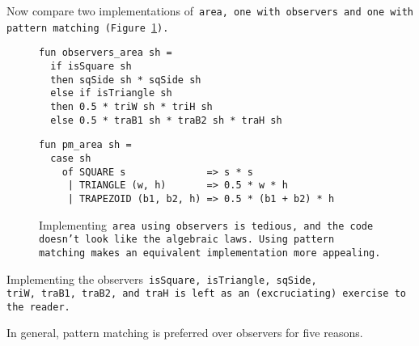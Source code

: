 \documentclass[manuscript,screen 12pt, nonacm]{acmart}
\begin{document}
Now compare two implementations of~\tt{area}, one with observers and one with
pattern matching (Figure~\ref{fig:area}).

    \begin{figure}[H]
      \begin{minipage}[t]{0.7\textwidth}
        \begin{verbatim}
fun observers_area sh =
  if isSquare sh
  then sqSide sh * sqSide sh
  else if isTriangle sh 
  then 0.5 * triW sh * triH sh
  else 0.5 * traB1 sh * traB2 sh * traH sh
            \end{verbatim}
            \label{fig:observersarea} 
      \end{minipage}
      \vfill
      \begin{minipage}[t]{0.7\textwidth}
        \begin{verbatim}
fun pm_area sh =
  case sh 
    of SQUARE s              => s * s
     | TRIANGLE (w, h)       => 0.5 * w * h
     | TRAPEZOID (b1, b2, h) => 0.5 * (b1 + b2) * h
                \end{verbatim}
       \vspace{2.2em}
       \label{fig:pmarea}
      \end{minipage}
      \caption{Implementing~\tt{area} using observers is tedious, and the code
      doesn't look like the algebraic laws. Using pattern matching makes an
      equivalent implementation more appealing.}
      \label{fig:area}
    \end{figure}

    Implementing the observers~\tt{isSquare},~\tt{isTriangle},~\tt{sqSide},
    \tt{triW},~\tt{traB1},~\tt{traB2}, and~\tt{traH} is left as an
    (excruciating) exercise to the reader. 

    In general, pattern matching is preferred over observers for five reasons. 
\end{document}
